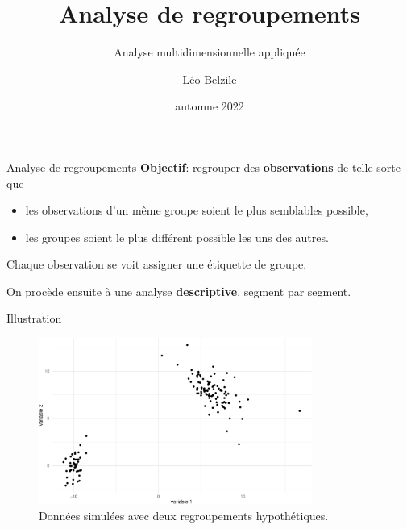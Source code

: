 \documentclass[
  ignorenonframetext,
]{beamer}
\title{Analyse de regroupements}
\subtitle{Analyse multidimensionnelle appliquée}
\author{Léo Belzile}
\date{automne 2022}
\institute{HEC Montréal}
\providecommand{\tightlist}{%
  \setlength{\itemsep}{0pt}\setlength{\parskip}{0pt}}\usepackage{longtable,booktabs,array}
\begin{document}
\frame{\titlepage}
\ifdefined\Shaded\renewenvironment{Shaded}{\begin{tcolorbox}[boxrule=0pt, breakable, sharp corners, enhanced, borderline west={3pt}{0pt}{shadecolor}, interior hidden, frame hidden]}{\end{tcolorbox}}\fi

\begin{frame}{Analyse de regroupements}
\protect\hypertarget{analyse-de-regroupements}{}
\textbf{Objectif}: regrouper des \textbf{observations} de telle sorte
que

\begin{itemize}
\tightlist
\item
  les observations d'un même groupe soient le plus semblables possible,
\item
  les groupes soient le plus différent possible les uns des autres.
\end{itemize}

Chaque observation se voit assigner une étiquette de groupe.

On procède ensuite à une analyse \textbf{descriptive}, segment par
segment.
\end{frame}

\begin{frame}{Illustration}
\protect\hypertarget{illustration}{}
\begin{figure}

{\centering \includegraphics[width=0.8\textwidth,height=\textheight]{MATH60602-diapos11_files/figure-beamer/fig-regroupements-bidons-1.pdf}

}

\caption{\label{fig-regroupements-bidons}Données simulées avec deux
regroupements hypothétiques.}

\end{figure}
\end{frame}
\end{document}
